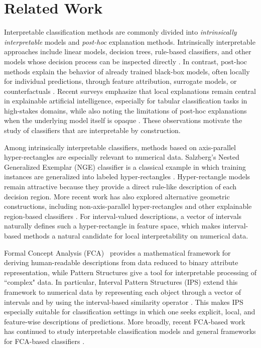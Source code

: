 \documentclass[a4paper,fleqn]{cas-sc}
\begin{document}
\section{Related Work}

Interpretable classification methods are commonly divided into \emph{intrinsically interpretable} models and \emph{post-hoc} explanation methods. Intrinsically interpretable approaches include linear models, decision trees, rule-based classifiers, and other models whose decision process can be inspected directly \cite{molnar2025, rudin2019stop}. In contrast, post-hoc methods explain the behavior of already trained black-box models, often locally for individual predictions, through feature attribution, surrogate models, or counterfactuals \cite{ribeiro2016should, wachter2017counterfactual, bodria2023benchmarking}. Recent surveys emphasize that local explanations remain central in explainable artificial intelligence, especially for tabular classification tasks in high-stakes domains, while also noting the limitations of post-hoc explanations when the underlying model itself is opaque \cite{bodria2023benchmarking, hakkoum2024global, sokol2020interpretable}. These observations motivate the study of classifiers that are interpretable by construction.

Among intrinsically interpretable classifiers, methods based on axis-parallel hyper-rectangles are especially relevant to numerical data. Salzberg's Nested Generalized Exemplar (NGE) classifier is a classical example in which training instances are generalized into labeled hyper-rectangles \cite{salzberg1991nearest}. Hyper-rectangle models remain attractive because they provide a direct rule-like description of each decision region. More recent work has also explored alternative geometric constructions, including non-axis-parallel hyper-rectangles and other explainable region-based classifiers \cite{kirmse2014large, sun2022geometrically, liapis2025interpretable}. For interval-valued descriptions, a vector of intervals naturally defines such a hyper-rectangle in feature space, which makes interval-based methods a natural candidate for local interpretability on numerical data.

Formal Concept Analysis (FCA)~\cite{ganter2024formal}  provides a mathematical framework for deriving human-readable descriptions from data reduced to binary attribute representation, while Pattern Structures \cite{ganter2001pattern} give a tool for interpretable processing of ``complex" data. In particular, Interval Pattern Structures (IPS) extend this framework to numerical data by representing each object through a vector of intervals and by using the interval-based similarity operator \cite{kuznetsov2013fitting, kaytoue2011mining, kaytoue2011revisiting}. This makes IPS especially suitable for classification settings in which one seeks explicit, local, and feature-wise descriptions of predictions. More broadly, recent FCA-based work has continued to study interpretable classification models and general frameworks for FCA-based classifiers \cite{hu2024three}.
\end{document}
